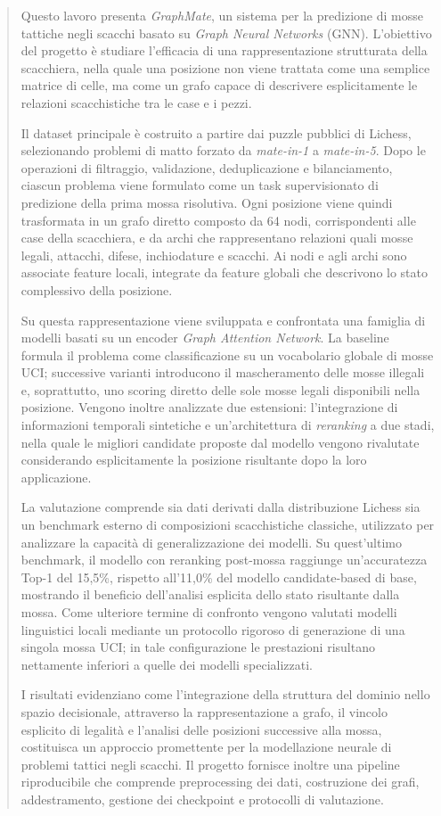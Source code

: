 \begin{abstract}
Questo lavoro presenta \textit{GraphMate}, un sistema per la predizione di mosse
tattiche negli scacchi basato su \textit{Graph Neural Networks} (GNN). L'obiettivo
del progetto è studiare l'efficacia di una rappresentazione strutturata della
scacchiera, nella quale una posizione non viene trattata come una semplice matrice
di celle, ma come un grafo capace di descrivere esplicitamente le relazioni
scacchistiche tra le case e i pezzi.

Il dataset principale è costruito a partire dai puzzle pubblici di Lichess,
selezionando problemi di matto forzato da \textit{mate-in-1} a
\textit{mate-in-5}. Dopo le operazioni di filtraggio, validazione,
deduplicazione e bilanciamento, ciascun problema viene formulato come un task
supervisionato di predizione della prima mossa risolutiva. Ogni posizione viene
quindi trasformata in un grafo diretto composto da 64 nodi, corrispondenti alle
case della scacchiera, e da archi che rappresentano relazioni quali mosse legali,
attacchi, difese, inchiodature e scacchi. Ai nodi e agli archi sono associate
feature locali, integrate da feature globali che descrivono lo stato complessivo
della posizione.

Su questa rappresentazione viene sviluppata e confrontata una famiglia di modelli
basati su un encoder \textit{Graph Attention Network}. La baseline formula il
problema come classificazione su un vocabolario globale di mosse UCI; successive
varianti introducono il mascheramento delle mosse illegali e, soprattutto, uno
scoring diretto delle sole mosse legali disponibili nella posizione. Vengono
inoltre analizzate due estensioni: l'integrazione di informazioni temporali
sintetiche e un'architettura di \textit{reranking} a due stadi, nella quale le
migliori candidate proposte dal modello vengono rivalutate considerando
esplicitamente la posizione risultante dopo la loro applicazione.

La valutazione comprende sia dati derivati dalla distribuzione Lichess sia un
benchmark esterno di composizioni scacchistiche classiche, utilizzato per
analizzare la capacità di generalizzazione dei modelli. Su quest'ultimo benchmark,
il modello con reranking post-mossa raggiunge un'accuratezza Top-1 del 15,5\%,
rispetto all'11,0\% del modello candidate-based di base, mostrando il beneficio
dell'analisi esplicita dello stato risultante dalla mossa. Come ulteriore termine
di confronto vengono valutati modelli linguistici locali mediante un protocollo
rigoroso di generazione di una singola mossa UCI; in tale configurazione le
prestazioni risultano nettamente inferiori a quelle dei modelli specializzati.

I risultati evidenziano come l'integrazione della struttura del dominio nello
spazio decisionale, attraverso la rappresentazione a grafo, il vincolo esplicito
di legalità e l'analisi delle posizioni successive alla mossa, costituisca un
approccio promettente per la modellazione neurale di problemi tattici negli
scacchi. Il progetto fornisce inoltre una pipeline riproducibile che comprende
preprocessing dei dati, costruzione dei grafi, addestramento, gestione dei
checkpoint e protocolli di valutazione.
\end{abstract}